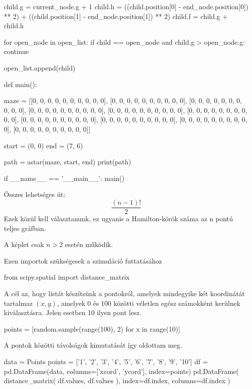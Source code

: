 \begin{python}
            child.g = current_node.g + 1
            child.h = ((child.position[0] - end_node.position[0]) ** 2) + ((child.position[1] - end_node.position[1]) ** 2)
            child.f = child.g + child.h

            for open_node in open_list:
                if child == open_node and child.g > open_node.g:
                    continue

            open_list.append(child)


def main():

    maze = [[0, 0, 0, 0, 0, 0, 0, 0, 0, 0],
            [0, 0, 0, 0, 0, 0, 0, 0, 0, 0],
            [0, 0, 0, 0, 0, 0, 0, 0, 0, 0],
            [0, 0, 0, 0, 0, 0, 0, 0, 0, 0],
            [0, 0, 0, 0, 0, 0, 0, 0, 0, 0],
            [0, 0, 0, 0, 0, 0, 0, 0, 0, 0],
            [0, 0, 0, 0, 0, 0, 0, 0, 0, 0],
            [0, 0, 0, 0, 0, 0, 0, 0, 0, 0],
            [0, 0, 0, 0, 0, 0, 0, 0, 0, 0],
            [0, 0, 0, 0, 0, 0, 0, 0, 0, 0]]

    start = (0, 0)
    end = (7, 6)

    path = astar(maze, start, end)
    print(path)


if __name__ == '__main__':
    main()

\end{python}


Összes lehetséges út:
\[
\dfrac{(n-1)!}{2}
\]
Ezek közül kell választanunk, ez ugyanis a Hamilton-körök száma az n pontú teljes gráfban.

A képlet csak $n > 2$ esetén működik.

Ezen importok szükségesek a szimuláció futtatásához

\begin{python}
from scipy.spatial import distance_matrix
\end{python}

A cél az, hogy listát készítsünk a pontokról, amelyek mindegyike két koordinátát tartalmaz $(x, y)$, amelyek 0 és 100 közötti véletlen egész számokként kerülnek kiválasztásra. Jelen esetben 10 ilyen pont lesz.

\begin{python}
points = [random.sample(range(100), 2) for x in range(10)]
\end{python}

A pontok közötti távolságok kimutatását így oldottam meg.

\begin{python}
data = Points
points = ['1', '2', '3', '4', '5', '6', '7', '8', '9', '10']
df = pd.DataFrame(data, columns=['xcord', 'ycord'], index=points)
pd.DataFrame(
	distance_matrix(
		df.values, 
		df.values
	), 
	index=df.index,
	columns=df.index
)
\end{python}


